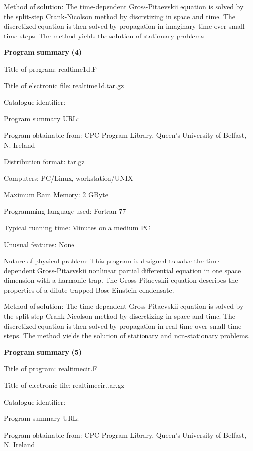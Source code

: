 \documentclass[onecolumn]{elsart3p}
\begin{document}
Method of solution: The time-dependent Gross-Pitaevskii equation is 
solved by the split-step Crank-Nicolson method by discretizing in space 
and time. The discretized equation is then solved by propagation in 
imaginary time over small time steps.  The method yields the solution of 
stationary problems.  


{\bf Program summary (4)}

Title of program: realtime1d.F

Title of electronic file: realtime1d.tar.gz

Catalogue identifier:

Program summary URL: 

Program obtainable from: CPC Program Library, Queen's University of 
Belfast, N. Ireland

Distribution format: tar.gz

Computers: PC/Linux, workstation/UNIX

Maximum Ram Memory: 2 GByte

Programming language used: Fortran 77




Typical running time: Minutes on a medium PC

Unusual features: None

Nature of physical problem: This program is designed to solve the
time-dependent Gross-Pitaevskii nonlinear partial differential equation
in one space dimension with a harmonic trap. The Gross-Pitaevskii
equation describes the properties of a dilute trapped Bose-Einstein
condensate.


Method of solution: The time-dependent Gross-Pitaevskii equation is 
solved by the split-step Crank-Nicolson method by discretizing in space 
and time. The discretized equation is then solved by propagation in 
real time over small time steps.  The method yields the solution of 
stationary and non-stationary problems.  


{\bf Program summary (5)}

Title of program: realtimecir.F

Title of electronic file: realtimecir.tar.gz


Catalogue identifier:

Program summary URL: 

Program obtainable from: CPC Program Library, Queen's University of 
Belfast, N. Ireland
\end{document}

